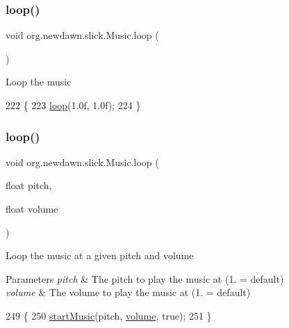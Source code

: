 \subsubsection{\texorpdfstring{loop()}{loop()}\hspace{0.1cm}{\footnotesize\ttfamily [1/2]}}
{\footnotesize\ttfamily void org.\+newdawn.\+slick.\+Music.\+loop (\begin{DoxyParamCaption}{ }\end{DoxyParamCaption})\hspace{0.3cm}{\ttfamily [inline]}}

Loop the music 
\begin{DoxyCode}
222                        \{
223         \mbox{\hyperlink{classorg_1_1newdawn_1_1slick_1_1_music_aadc35375936c47d7a0e40cd1d719d070}{loop}}(1.0f, 1.0f); 
224     \}
\end{DoxyCode}
\mbox{\label{classorg_1_1newdawn_1_1slick_1_1_music_a7271654211e5d63c0a50b8ed7605a3a5}} 
\subsubsection{\texorpdfstring{loop()}{loop()}\hspace{0.1cm}{\footnotesize\ttfamily [2/2]}}
{\footnotesize\ttfamily void org.\+newdawn.\+slick.\+Music.\+loop (\begin{DoxyParamCaption}\item[{float}]{pitch,  }\item[{float}]{volume }\end{DoxyParamCaption})\hspace{0.3cm}{\ttfamily [inline]}}

Loop the music at a given pitch and volume


\begin{DoxyParams}{Parameters}
{\em pitch} & The pitch to play the music at (1. = default) \\
\hline
{\em volume} & The volume to play the music at (1. = default) \\
\hline
\end{DoxyParams}

\begin{DoxyCode}
249                                                 \{
250         \mbox{\hyperlink{classorg_1_1newdawn_1_1slick_1_1_music_afe4ced4d5134a3bfea291254e6fd2934}{startMusic}}(pitch, \mbox{\hyperlink{classorg_1_1newdawn_1_1slick_1_1_music_a2fa10b80767b1a05925e1dc89a088e90}{volume}}, \textcolor{keyword}{true});
251     \}
\end{DoxyCode}
\mbox{\label{classorg_1_1newdawn_1_1slick_1_1_music_a1161bc6fe6a0ba7ab6284758b0a8306d}} 
